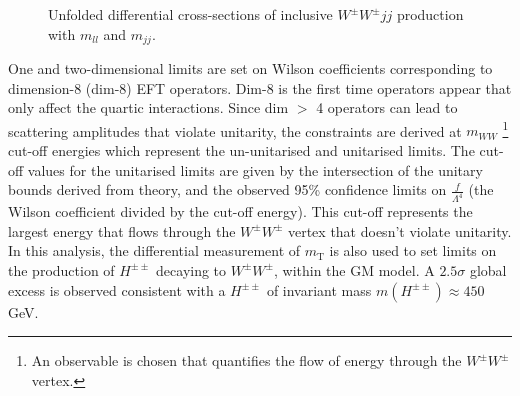 \documentclass{v23windows}
\begin{document}
\begin{figure}
       \begin{minipage}{6in}
           \centering
           \centering
       \end{minipage}
       \caption{Unfolded differential cross-sections of inclusive $W^\pm W^\pm jj$ production with $m_{ll}$ and $m_{jj}$.\protect\cite{ssww}}
\end{figure}\noindent
One and two-dimensional limits are set on Wilson coefficients corresponding to dimension-8 (dim-8) EFT operators. Dim-8 is the first time operators appear that only affect the quartic interactions. Since dim $>$ 4 operators can lead to scattering amplitudes that violate unitarity, the constraints are derived at $m_{WW}$ \footnote{An observable is chosen that quantifies the flow of energy through the $W^\pm W^\pm$ vertex.} cut-off energies which represent the un-unitarised and unitarised limits. The  cut-off values for the unitarised limits are given by the intersection of the unitary bounds derived from theory, and the observed 95\% confidence limits on $\frac{f}{\Lambda^4}$ (the Wilson coefficient divided by the cut-off energy). This cut-off represents the largest energy that flows through the $W^\pm W^\pm$ vertex that doesn't violate unitarity. In this analysis, the differential measurement of $m_{\mathrm{T}}$ is also used to set limits on the production of $H^{\pm\pm}$ decaying to $W^\pm W^\pm$, within the GM model. A $2.5\sigma$ global excess is observed consistent with a $H^{\pm\pm}$ of invariant mass $m(H^{\pm\pm})\approx450$ GeV.
\end{document}
